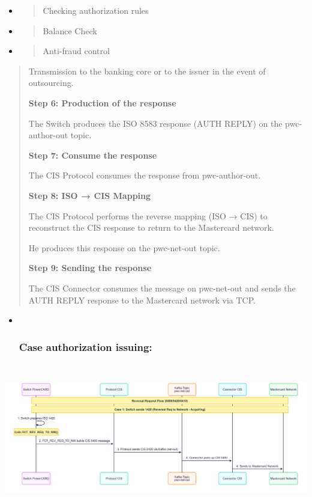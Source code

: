 \documentclass[12pt,a4paper]{report}
\begin{document}
\begin{itemize}
\item
  \begin{quote}
  Checking authorization rules
  \end{quote}
\item
  \begin{quote}
  Balance Check
  \end{quote}
\item
  \begin{quote}
  Anti-fraud control
  \end{quote}
\end{itemize}

\begin{quote}
Transmission to the banking core or to the issuer in the event of
outsourcing.

\textbf{Step 6: Production of the response}

The Switch produces the ISO 8583 response (AUTH REPLY) on the
pwc-author-out topic.

\textbf{Step 7: Consume the response}

The CIS Protocol consumes the response from pwc-author-out.

\textbf{Step 8: ISO → CIS Mapping}

The CIS Protocol performs the reverse mapping (ISO → CIS) to reconstruct
the CIS response to return to the Mastercard network.

He produces this response on the pwc-net-out topic.

\textbf{Step 9: Sending the response}

The CIS Connector consumes the message on pwc-net-out and sends the AUTH
REPLY response to the Mastercard network via TCP.
\end{quote}

\begin{itemize}
\item ~
  \hypertarget{case-authorization-issuing}{%
  \subsubsection{\texorpdfstring{\textbf{Case authorization
  issuing:}}{Case authorization issuing:}}\label{case-authorization-issuing}}
\end{itemize}

\includegraphics[width=6.97452in,height=2.54278in]{vertopal_d1b0b2209edd4c6aa8254f57daa0953b/media/image39.png}
\end{document}
